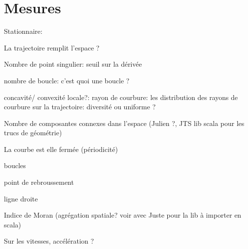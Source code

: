 \documentclass[11pt,a4paper]{article}
\begin{document}
\section{Mesures}
Stationnaire:

La trajectoire remplit l'espace ?

Nombre de point singulier: seuil sur la dérivée

nombre de boucle: c'est quoi une boucle ?

concavité/ convexité locale?: rayon de courbure: les distribution des rayons de courbure sur la trajectoire: diversité ou uniforme ?

Nombre de composantes connexes dans l'espace (Julien ?, JTS lib scala pour les trucs de géométrie)

La courbe est elle fermée (périodicité)

boucles

point de rebroussement

ligne droite

Indice de Moran (agrégation spatiale? voir avec Juste pour la lib à importer en scala)

Sur les vitesses, accélération ?




 
\end{document}

